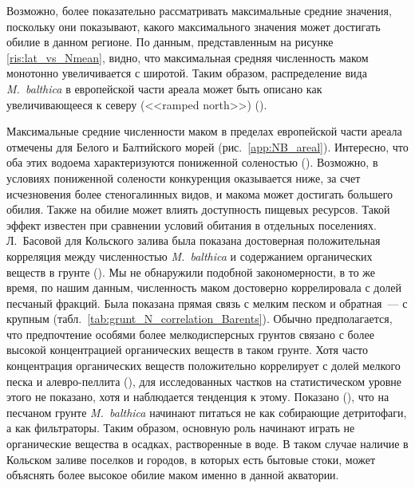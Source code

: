 Возможно, более показательно рассматривать максимальные средние значения, поскольку они показывают, какого максимального значения может достигать обилие в данном регионе.
По данным, представленным на рисунке \ref{ris:lat_vs_Nmean}, видно, что максимальная средняя численность маком монотонно увеличивается с широтой.
Таким образом, распределение вида {\it M.~balthica} в европейской части ареала может быть описано как увеличивающееся к северу (<<ramped north>>) (\cite{Sagarin_Gaines_2002}).

Максимальные средние численности маком в пределах европейской части ареала отмечены для Белого и Балтийского морей (рис.~\ref{app:NB_areal}).
Интересно, что оба этих водоема характеризуются пониженной соленостью (\cite{Dobrovolskiy_Zalogin_1982}).
Возможно, в условиях пониженной солености конкуренция оказывается ниже, за счет исчезновения более стеногалинных видов, и макома может достигать большего обилия.
Также на обилие может влиять доступность пищевых ресурсов. 
Такой эффект известен при сравнении условий обитания в отдельных поселениях.
Л.~Басовой для Кольского залива была показана достоверная положительная корреляция между численностью {\it M.~balthica} и содержанием органических веществ в грунте (\cite{Basova_2004}).   
Мы не обнаружили подобной закономерности, в то же время, по нашим данным, численность маком достоверно коррелировала с долей песчаный фракций. 
Была показана прямая связь с мелким песком и обратная~--- с крупным (табл.~\ref{tab:grunt_N_correlation_Barents}).
Обычно предполагается, что предпочтение особями более мелкодисперсных грунтов связано с более высокой концентрацией органических веществ в таком грунте. 
Хотя часто концентрация органических веществ положительно коррелирует с долей мелкого песка и алевро-пеллита (\cite{Bubnova_1972, Basova_2004}), для исследованных частков на статистическом уровне этого не показано, хотя и наблюдается тенденция к этому. 
Показано (\cite{Olafsson_1989}), что на песчаном грунте {\it M.~balthica} начинают питаться не как собирающие детритофаги, а как фильтраторы. 
Таким образом, основную роль начинают играть не органические вещества в осадках, растворенные в воде. 
В таком случае наличие в Кольском заливе поселков и городов, в которых есть бытовые стоки, может объяснять более высокое обилие маком именно в данной акватории.


